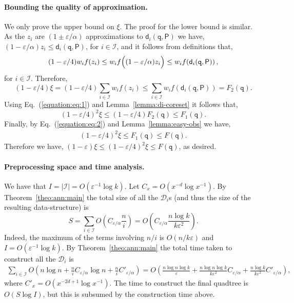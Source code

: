 \documentclass[12pt]{article}
\providecommand{\lemref}[1]{Lemma~\ref{lemma:#1}}
\theoremstyle{remark}{\theorembodyfont{\rm} \newtheorem{remark}[theorem]{Remark}}
\newcommand{\thmref}[1]{Theorem~\ref{theo:#1}}
\newcommand{\eqlab}[1]{\label{equation:#1}}
\newcommand{\Eqref}[1]{Eq.~(\ref{equation:#1})}
\newcommand{\MakeBig}{\rule[-.2cm]{0cm}{0.4cm}}
\newcommand{\pth}[2][\!]{#1\left({#2}\right)}
\newcommand{\distPk}[3]{\mathsf{d}_{#3}\pth{#2,#1}}
\newcommand{\nfrac}[2]{{#1}/{#2}}
\newcommand{\cardin}[1]{\left\lvert {#1} \right\rvert}
\newcommand{\order}[1]{O\pth{#1}}
\newcommand{\eps}{{\varepsilon}}\newcommand{\divides}{|}
\newcommand{\DDM}[2]{F}
\newcommand{\aDDM}[2]{{F}_1}
\newcommand{\ADDM}[2]{F_2}
\newcommand{\IdxSet}{\mathcal{I}}
\newcommand{\PntSet}{\mathsf{P}}
\newcommand{\query}{\mathtt{q}}
\newcommand{\numA}{z}
\newcommand{\DS}{\mathcal{D}}\newcommand{\Array}{\mathcal{X}}
\begin{document}
\paragraph{Bounding the quality of approximation.}
We only prove the upper bound on $\xi$. The proof for the lower
bound is similar.  As the $\numA_i$ are $(1 \pm \eps/\alpha)$
approximations to $\distPk{\PntSet}{\query}{i}$ we have,
$(1-\eps/\alpha)\numA_i \leq \distPk{\PntSet}{\query}{i}$, for $i \in
\IdxSet$, and it follows from definitions that,
\begin{align*}
    (1-\eps/4)w_if(\numA_i)\leq w_if\pth{\MakeBig (1-\eps/\alpha)\numA_i}\leq w_i f\pth{ \distPk{\PntSet}{\query}{i}},
\end{align*}
for $i \in \IdxSet$.  Therefore,
\begin{equation}
    \eqlab{eq:1}(1 - \eps/4) \xi = (1-\eps/4)
    \sum_{i \in \IdxSet} w_i f(\numA_i)\leq \sum_{i \in \IdxSet}
    w_i f\pth{ \distPk{\PntSet}{\query}{i}} = \ADDM{k}{f}(\query).
\end{equation}
Using \Eqref{eq:1} and \lemref{di-coreset} it follows that,
\begin{equation}\eqlab{eq:2}(1-\eps/4)^2 \xi \leq (1-\eps/4)
    \ADDM{k}{f}(\query) \leq \aDDM{k}{f}(\query).
\end{equation}
Finally, by \Eqref{eq:2} and \lemref{easy-obs} we have,
\begin{align*}
    (1-\eps/4)^2 \xi \leq \aDDM{k}{f}(\query) \leq
    \DDM{k}{f}(\query).
\end{align*}
Therefore we have, $(1-\eps) \xi \leq (1-\eps/4)^2 \xi \leq
\DDM{k}{f}(\query)$, as desired.


\paragraph{Preprocessing space and time analysis.}
We have that $I = \cardin{\IdxSet} = O\pth{ \eps^{-1} \log k}$.  Let
$C_{x}= \order{x^{-d}\log x^{-1}}$.  By \thmref{ann:main} the total
size of all the $\DS_i$s (and thus the size of the resulting
data-structure) is
\begin{equation}\eqlab{eq:3}S = \sum_{i \in \IdxSet} \order{C_{\eps/\alpha} \frac{n}{i}} =
    \order{C_{\eps/\alpha} \frac{n \log k}{k \eps^2}}.
\end{equation}
Indeed, the maximum of the terms involving $n/i$ is
$\order{\nfrac{n}{k \eps}}$ and $I = \order{\eps^{-1} \log k}$.  By
\thmref{ann:main} the total time taken to construct all the $\DS_i$ is
\begin{align*}
    \sum_{i \in \IdxSet} \order{n \log n + \frac{n}{i} C_{\eps/\alpha}
       \log n + \frac{n}{i} C'_{\eps/\alpha}}=\order{\frac{n \log n \log k}{\eps} + \frac{n\log n\log k}{k
          \eps^2} C_{\eps/\alpha} + \frac{n \log k}{k \eps^2}
       C'_{\eps/\alpha}},
\end{align*}
where $C'_{x} = \order{x^{-2d+1}\log x^{-1}}$.  The time to construct
the final quadtree is $\order{S \log I}$, but this is subsumed by the
construction time above.
\end{document}
